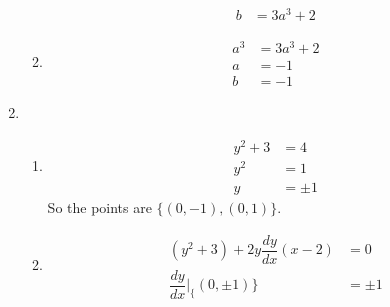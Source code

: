 \documentclass[12pt]{article}
\begin{document}
\begin{enumerate}
\begin{enumerate}
\begin{align*}
                b&=3a^3+2
            \end{align*}
            \item \begin{align*}
                a^3&=3a^3+2\\
                a&=-1\\
                b&=-1
            \end{align*}
        \end{enumerate}
        \item \begin{enumerate}
            \item \begin{align*}
                y^2+3&=4\\
                y^2&=1\\
                y&=\pm 1
            \end{align*}
            So the points are $\{(0,-1),(0,1)\}$.
            \item \begin{align*}
                (y^2+3)+2y\dfrac{dy}{dx}(x-2)&=0\\
                \dfrac{dy}{dx}|_\{(0,\pm 1)\}&=\pm 1
            \end{align*}
        \end{enumerate}
    \end{enumerate}
\end{document}
